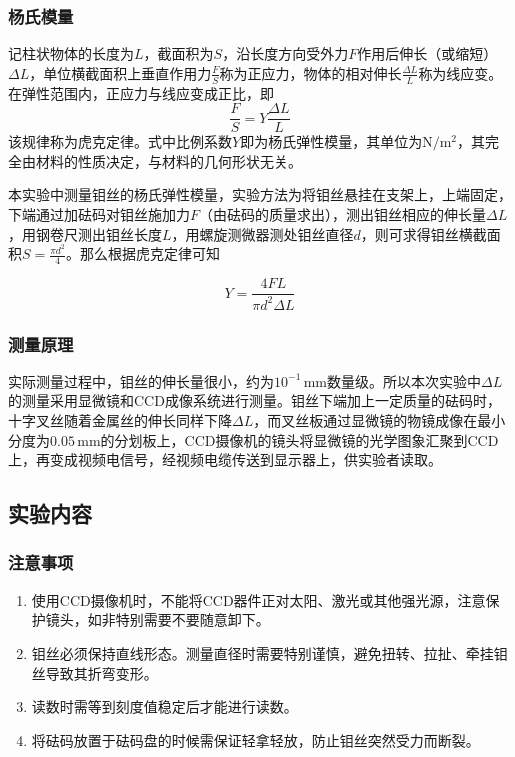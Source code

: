 \documentclass[zihao=5, UTF8]{article}
\theoremstyle{MyLineTheoremStyle} %
\theoremstyle{MyBlockTheoremStyle} %
\theoremstyle{MySubsubsectionStyle} %
\begin{document}
\subsubsection{杨氏模量}

记柱状物体的长度为$ L $，截面积为$ S $，沿长度方向受外力$ F $作用后伸长（或缩短）$ \Delta L $，单位横截面积上垂直作用力$ \frac FS $称为正应力，物体的相对伸长$ \frac{\Delta L}{L} $称为线应变。在弹性范围内，正应力与线应变成正比，即
\begin{equation}
    \frac FS=Y\frac{\Delta L}{L}
\end{equation}
该规律称为虎克定律。式中比例系数$ Y $即为杨氏弹性模量，其单位为$ \mathrm{N/m^2} $，其完全由材料的性质决定，与材料的几何形状无关。

本实验中测量钼丝的杨氏弹性模量，实验方法为将钼丝悬挂在支架上，上端固定，下端通过加砝码对钼丝施加力$ F $（由砝码的质量求出），测出钼丝相应的伸长量$ \Delta L $，用钢卷尺测出钼丝长度$ L $，用螺旋测微器测处钼丝直径$ d $，则可求得钼丝横截面积$ S=\frac{\pi d^2}{4} $。那么根据虎克定律可知

\begin{equation}
    Y=\frac{4FL}{\pi d^2\Delta L}
\end{equation}

\subsubsection{测量原理}

实际测量过程中，钼丝的伸长量很小，约为$ 10^{-1}\,\mathrm{mm} $数量级。所以本次实验中$ \Delta L $的测量采用显微镜和CCD成像系统进行测量。钼丝下端加上一定质量的砝码时，十字叉丝随着金属丝的伸长同样下降$ \Delta L $，而叉丝板通过显微镜的物镜成像在最小分度为$ 0.05\,\mathrm{mm} $的分划板上，CCD摄像机的镜头将显微镜的光学图象汇聚到CCD上，再变成视频电信号，经视频电缆传送到显示器上，供实验者读取。

\subsection{实验内容}

\subsubsection{注意事项}

\begin{enumerate}
    \item 使用CCD摄像机时，不能将CCD器件正对太阳、激光或其他强光源，注意保护镜头，如非特别需要不要随意卸下。
    \item 钼丝必须保持直线形态。测量直径时需要特别谨慎，避免扭转、拉扯、牵挂钼丝导致其折弯变形。
    \item 读数时需等到刻度值稳定后才能进行读数。
    \item 将砝码放置于砝码盘的时候需保证轻拿轻放，防止钼丝突然受力而断裂。
\end{enumerate}
\end{document}
